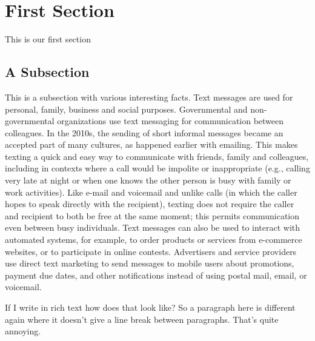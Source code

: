 \section{First Section}
This is our first section
\subsection{A Subsection}
This is a subsection with various interesting facts. Text messages are used for personal, family, business and social purposes. Governmental and non-governmental organizations use text messaging for communication between colleagues. In the 2010s, the sending of short informal messages became an accepted part of many cultures, as happened earlier with emailing. This makes texting a quick and easy way to communicate with friends, family and colleagues, including in contexts where a call would be impolite or inappropriate (e.g., calling very late at night or when one knows the other person is busy with family or work activities). Like e-mail and voicemail and unlike calls (in which the caller hopes to speak directly with the recipient), texting does not require the caller and recipient to both be free at the same moment; this permits communication even between busy individuals. Text messages can also be used to interact with automated systems, for example, to order products or services from e-commerce websites, or to participate in online contests. Advertisers and service providers use direct text marketing to send messages to mobile users about promotions, payment due dates, and other notifications instead of using postal mail, email, or voicemail. 

 If I write in rich text how does that look like? So a paragraph here is different again where it doesn't give a line break between paragraphs. That's quite annoying.